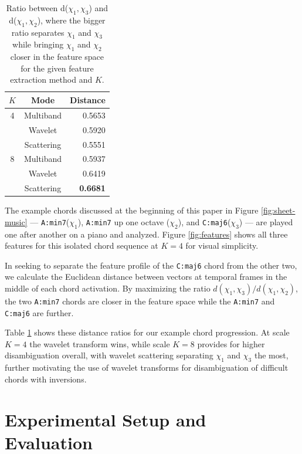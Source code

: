 \documentclass{article}
\makeatletter
\newcommand{\Amin}{\texttt{A:min7}\@\xspace}
\newcommand{\Csix}{\texttt{C:maj6}\@\xspace}
\makeatother
\begin{document}
\begin{table}[t!]
	\begin{center}
	\begin{tabular} {| c | c | r |}
	\hline
	$K$ & Mode & Distance \\
	\hline
	4 & Multiband & 0.5653 \\
	& Wavelet & 0.5920 \\
	& Scattering & 0.5551 \\
	\hline
	8 & Multiband & 0.5937 \\
	& Wavelet & 0.6419 \\
	& Scattering & \textbf{0.6681} \\

	\hline
	\end{tabular}
	\end{center}
	\caption{Ratio between d($\chi_1,\chi_3$) and d($\chi_1,\chi_2$), where the bigger ratio separates $\chi_1$ and $\chi_3$ while bringing $\chi_1$ and $\chi_2$ closer in the feature space for the given feature extraction method and $K$.}
	\label{table:distances}
\end{table}

The example chords discussed at the beginning of this paper in Figure \ref{fig:sheet-music} ---
\Amin ($\chi_1$), \Amin up one octave ($\chi_2$), and \Csix ($\chi_3$) ---  are played one after another on a piano and analyzed. Figure \ref{fig:features} shows all three features for this isolated chord sequence at $K=4$ for visual simplicity. 

In seeking to separate the feature profile of the \Csix chord from the other two, we calculate the Euclidean distance between vectors at temporal frames in the middle of each chord activation. By maximizing the ratio $d(\chi_1,\chi_3)/d(\chi_1,\chi_2)$, the two \Amin chords are closer in the feature space while the \Amin and \Csix are further.

Table \ref{table:distances} shows these distance ratios for our example chord progression. At scale $K=4$ the wavelet transform wins, while scale $K=8$ provides for higher disambiguation overall, with wavelet scattering separating $\chi_1$ and $\chi_3$ the most, further motivating the use of wavelet transforms for disambiguation of difficult chords with inversions.

\section{Experimental Setup and Evaluation}\label{sec:experiment}
\end{document}
